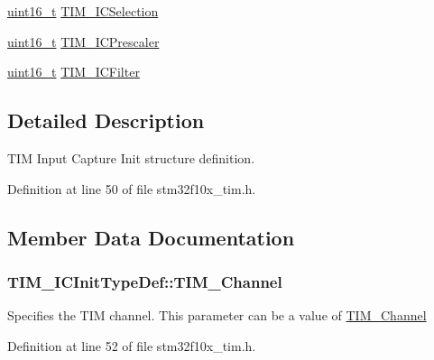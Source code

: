 \begin{DoxyCompactItemize}
\item 
\hyperlink{_p_e___types_8h_a1f1825b69244eb3ad2c7165ddc99c956}{uint16\+\_\+t} \hyperlink{struct_t_i_m___i_c_init_type_def_a00b9a72e895a43dc18c69c96a149f080}{T\+I\+M\+\_\+\+I\+C\+Selection}
\item 
\hyperlink{_p_e___types_8h_a1f1825b69244eb3ad2c7165ddc99c956}{uint16\+\_\+t} \hyperlink{struct_t_i_m___i_c_init_type_def_ac61c7fc999ace295ac81b304cabd61e0}{T\+I\+M\+\_\+\+I\+C\+Prescaler}
\item 
\hyperlink{_p_e___types_8h_a1f1825b69244eb3ad2c7165ddc99c956}{uint16\+\_\+t} \hyperlink{struct_t_i_m___i_c_init_type_def_a72539caa6e965e4fa89e3b21b188cf26}{T\+I\+M\+\_\+\+I\+C\+Filter}
\end{DoxyCompactItemize}


\subsection{Detailed Description}
T\+IM Input Capture Init structure definition. 

Definition at line 50 of file stm32f10x\+\_\+tim.\+h.



\subsection{Member Data Documentation}
\subsubsection[{\texorpdfstring{T\+I\+M\+\_\+\+Channel}{TIM_Channel}}]{ T\+I\+M\+\_\+\+I\+C\+Init\+Type\+Def\+::\+T\+I\+M\+\_\+\+Channel}\hypertarget{struct_t_i_m___i_c_init_type_def_a251495d3310ddd8b0ded95f6b8746592}{}\label{struct_t_i_m___i_c_init_type_def_a251495d3310ddd8b0ded95f6b8746592}
Specifies the T\+IM channel. This parameter can be a value of \hyperlink{group___t_i_m___channel}{T\+I\+M\+\_\+\+Channel} 

Definition at line 52 of file stm32f10x\+\_\+tim.\+h.

